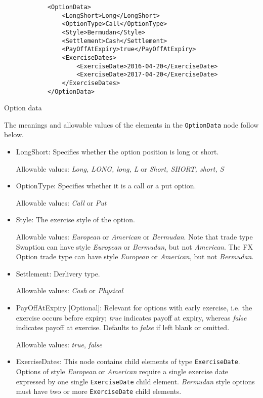 \begin{listing}[H]
\begin{verbatim}
            <OptionData>
                <LongShort>Long</LongShort>
                <OptionType>Call</OptionType>
                <Style>Bermudan</Style>
                <Settlement>Cash</Settlement> 
                <PayOffAtExpiry>true</PayOffAtExpiry>
                <ExerciseDates>
                    <ExerciseDate>2016-04-20</ExerciseDate>
                    <ExerciseDate>2017-04-20</ExerciseDate>
                </ExerciseDates>
            </OptionData>
\end{verbatim}
\caption{Option data}
\label{lst:option_data}
\end{listing}

The meanings and allowable values of the elements in the \lstinline!OptionData! node follow below.

\begin{itemize}
\item LongShort: Specifies whether the option position is long  or
  short.  

Allowable values: \emph{Long, LONG, long, L} or \emph{Short, SHORT,
  short, S}

\item OptionType: Specifies whether it is a call or a put option. 

Allowable values: \emph{Call} or \emph{Put} 

\item Style: The exercise style of the option. 

  Allowable values: \emph{European} or \emph{American} or \emph{Bermudan}. Note that trade type Swaption can have style
  \emph{European} or \emph{Bermudan}, but not \emph{American}. The FX Option trade type can have style \emph{European}
  or \emph{American}, but not \emph{Bermudan}.

\item Settlement: Derlivery type. 

Allowable values: \emph{Cash} or \emph{Physical} 

\item PayOffAtExpiry [Optional]: Relevant for options with early
  exercise, i.e. the exercise occurs before expiry; \emph{true}
  indicates payoff at expiry, whereas \emph{false}  indicates payoff
  at exercise. Defaults to \emph{false}  if left blank or omitted. 

Allowable values: \emph{true}, \emph{false}

\item ExerciseDates: This node contains child elements of type
  \lstinline!ExerciseDate!.  Options of style \emph{European} or
  \emph{American} require a single exercise date expressed by one
  single \lstinline!ExerciseDate! child element.  \emph{Bermudan}
  style options must have two or more \lstinline!ExerciseDate! child
  elements.

\end{itemize}



